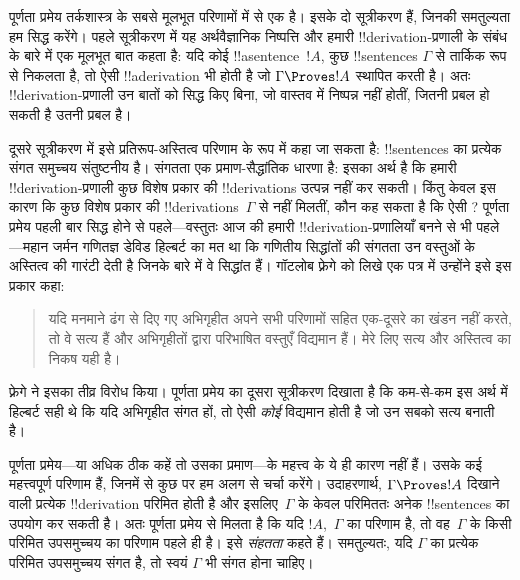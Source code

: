 \documentclass[../../../include/open-logic-section]{subfiles}
\begin{document}
      {}
      {}


पूर्णता प्रमेय तर्कशास्त्र के सबसे मूलभूत परिणामों में से एक है। इसके दो
सूत्रीकरण हैं, जिनकी समतुल्यता हम सिद्ध करेंगे। पहले सूत्रीकरण में यह
अर्थवैज्ञानिक निष्पत्ति और हमारी !!{derivation}-प्रणाली के संबंध के बारे में
एक मूलभूत बात कहता है: यदि कोई !!a{sentence}~$!A$, कुछ !!{sentence}s
$\Gamma$ से तार्किक रूप से निकलता है, तो ऐसी !!a{derivation} भी होती है जो
$\Gamma
\Proves !A$ स्थापित करती है। अतः !!{derivation}-प्रणाली उन बातों को
सिद्ध किए बिना, जो वास्तव में निष्पन्न नहीं होतीं, जितनी प्रबल हो सकती है
उतनी प्रबल है।

दूसरे सूत्रीकरण में इसे प्रतिरूप-अस्तित्व परिणाम के रूप में कहा जा सकता है:
!!{sentence}s का प्रत्येक संगत समुच्चय संतुष्टनीय है। संगतता एक
प्रमाण-सैद्धांतिक धारणा है: इसका अर्थ है कि हमारी !!{derivation}-प्रणाली कुछ
विशेष प्रकार की !!{derivation}s उत्पन्न नहीं कर सकती। किंतु केवल इस कारण कि
कुछ विशेष प्रकार की !!{derivation}s~$\Gamma$ से नहीं मिलतीं, कौन कह सकता है
कि ऐसी
? पूर्णता प्रमेय
पहली बार सिद्ध होने से पहले---वस्तुतः आज की हमारी !!{derivation}-प्रणालियाँ
बनने से भी पहले---महान जर्मन गणितज्ञ डेविड हिल्बर्ट का मत था कि गणितीय
सिद्धांतों की संगतता उन वस्तुओं के अस्तित्व की गारंटी देती है जिनके बारे में
वे सिद्धांत हैं। गॉटलोब फ़्रेगे को लिखे एक पत्र में उन्होंने इसे इस प्रकार
कहा:
\begin{quote}
  यदि मनमाने ढंग से दिए गए अभिगृहीत अपने सभी परिणामों सहित एक-दूसरे का
  खंडन नहीं करते, तो वे सत्य हैं और अभिगृहीतों द्वारा परिभाषित वस्तुएँ
  विद्यमान हैं। मेरे लिए सत्य और अस्तित्व का निकष यही है।
\end{quote}
फ़्रेगे ने इसका तीव्र विरोध किया। पूर्णता प्रमेय का दूसरा सूत्रीकरण दिखाता
है कि कम-से-कम इस अर्थ में हिल्बर्ट सही थे कि यदि अभिगृहीत संगत हों, तो ऐसी
\emph{कोई}
 विद्यमान होती है जो उन सबको सत्य
बनाती है।

पूर्णता प्रमेय---या अधिक ठीक कहें तो उसका प्रमाण---के महत्त्व के ये ही कारण
नहीं हैं। उसके कई महत्त्वपूर्ण परिणाम हैं, जिनमें से कुछ पर हम अलग से चर्चा
करेंगे। उदाहरणार्थ, $\Gamma \Proves !A$ दिखाने वाली प्रत्येक
!!{derivation} परिमित होती है और इसलिए~$\Gamma$ के केवल परिमिततः अनेक
!!{sentence}s का उपयोग कर सकती है। अतः पूर्णता प्रमेय से मिलता है कि यदि
$!A$,~$\Gamma$ का परिणाम है, तो वह~$\Gamma$ के किसी परिमित उपसमुच्चय का
परिणाम पहले ही है। इसे \emph{संहतता} कहते हैं। समतुल्यतः, यदि $\Gamma$ का
प्रत्येक परिमित उपसमुच्चय संगत है, तो स्वयं $\Gamma$ भी संगत होना चाहिए।
\end{document}
